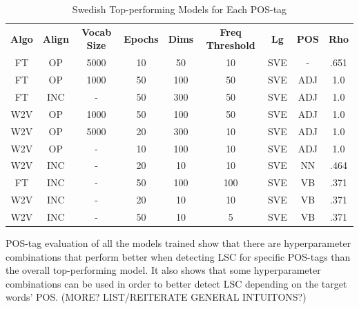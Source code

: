 \begin{table}[h]
\centering
\begin{tabular}{ccccccccc} 
\toprule
\textbf{ Algo } & \textbf{ Align } & \textbf{ Vocab Size } & \textbf{ Epochs } & \textbf{ Dims } & \textbf{ Freq Threshold } & \textbf{ Lg } & \textbf{ POS } & \textbf{ Rho }  \\
FT              & OP               & 5000                  & 10                & 50              & 10                        & SVE           & -              & .651            \\
FT              & OP               & 1000                  & 50                & 100             & 50                        & SVE           & ADJ            & 1.0             \\
FT              & INC              & -                     & 50                & 300             & 50                        & SVE           & ADJ            & 1.0             \\
W2V             & OP               & 1000                  & 50                & 100             & 50                        & SVE           & ADJ            & 1.0             \\
W2V             & OP               & 5000                  & 20                & 300             & 10                        & SVE           & ADJ            & 1.0             \\
W2V             & OP               & -                     & 10                & 100             & 10                        & SVE           & ADJ            & 1.0             \\
W2V             & INC              & -                     & 20                & 10              & 10                        & SVE           & NN             & .464            \\
FT              & INC              & -                     & 50                & 100             & 100                       & SVE           & VB             & .371            \\
W2V             & INC              & -                     & 20                & 10              & 10                        & SVE           & VB             & .371            \\
W2V             & INC              & -                     & 50                & 10              & 5                         & SVE           & VB             & .371            \\
\bottomrule
\end{tabular}
\caption{Swedish Top-performing Models for Each POS-tag}
\label{tab:sve-posresults}
\end{table}

POS-tag evaluation of all the models trained show that there are hyperparameter combinations that perform better when detecting LSC for specific POS-tags than the overall top-performing model. It also shows that some hyperparameter combinations can be used in order to better detect LSC depending on the target words’ POS. (MORE? LIST/REITERATE GENERAL INTUITONS?)
